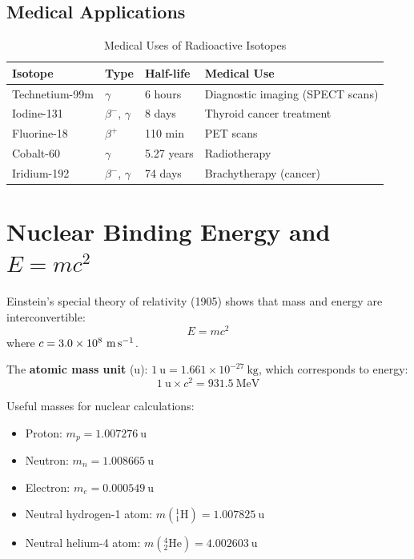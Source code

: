 \subsection{Medical Applications}

\begin{table}[H]
\centering
\caption{Medical Uses of Radioactive Isotopes}
\label{tab:medical_radioactivity}
\begin{tabular}{llll}
\toprule
\textbf{Isotope} & \textbf{Type} & \textbf{Half-life} &
\textbf{Medical Use}\\
\midrule
Technetium-99m & $\gamma$ & 6 hours & Diagnostic imaging
(SPECT scans)\\
Iodine-131 & $\beta^-$, $\gamma$ & 8 days &
  Thyroid cancer treatment\\
Fluorine-18 & $\beta^+$ & 110 min & PET scans\\
Cobalt-60 & $\gamma$ & 5.27 years & Radiotherapy\\
Iridium-192 & $\beta^-$, $\gamma$ & 74 days &
  Brachytherapy (cancer)\\
\bottomrule
\end{tabular}
\end{table}

\section{Nuclear Binding Energy and \texorpdfstring{$E = mc^2$}{E = mc2}}

\begin{definitionbox}
Einstein's special theory of relativity (1905) shows
that mass and energy are interconvertible:
\[
  E = mc^2
\]
where $c = 3.0\times10^8\ \text{m\,s}^{-1}$.

The \textbf{atomic mass unit} (u):
$1\ \text{u} = 1.661\times10^{-27}\ \text{kg}$,
which corresponds to energy:
\[
  1\ \text{u} \times c^2 = 931.5\ \text{MeV}
\]

Useful masses for nuclear calculations:
\begin{itemize}[noitemsep]
  \item Proton: $m_p = 1.007276\ \text{u}$
  \item Neutron: $m_n = 1.008665\ \text{u}$
  \item Electron: $m_e = 0.000549\ \text{u}$
  \item Neutral hydrogen-1 atom: $m({}^1_1\text{H}) = 1.007825\ \text{u}$
  \item Neutral helium-4 atom: $m({}^4_2\text{He}) = 4.002603\ \text{u}$
\end{itemize}
\end{definitionbox}

